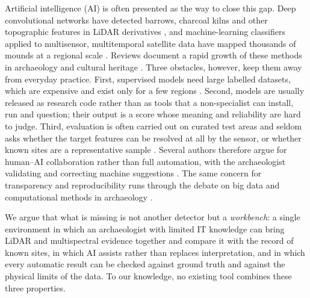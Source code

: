 Artificial intelligence (AI) is often presented as the way to close this gap. Deep convolutional networks have detected barrows, charcoal kilns and other topographic features in LiDAR derivatives \citep{verschoof2019rcnn,trier2019arran,somrak2020maya}, and machine-learning classifiers applied to multisensor, multitemporal satellite data have mapped thousands of mounds at a regional scale \citep{orengo2020mounds}. Reviews document a rapid growth of these methods in archaeology and cultural heritage \citep{davis2019obia,fiorucci2020mlch,bickler2021ml}. Three obstacles, however, keep them away from everyday practice. First, supervised models need large labelled datasets, which are expensive and exist only for a few regions \citep{kokalj2023mlready}. Second, models are usually released as research code rather than as tools that a non-specialist can install, run and question; their output is a score whose meaning and reliability are hard to judge. Third, evaluation is often carried out on curated test areas and seldom asks whether the target features can be resolved at all by the sensor, or whether known sites are a representative sample \citep{opitz2018trends,fontana2024sampling}. Several authors therefore argue for human--AI collaboration rather than full automation, with the archaeologist validating and correcting machine suggestions \citep{lambers2019citizen,doneus2022hitl,casini2023humanai}. The same concern for transparency and reproducibility runs through the debate on big data and computational methods in archaeology \citep{huggett2020bigdata,marwick2017reproducibility}.

We argue that what is missing is not another detector but a \emph{workbench}: a single environment in which an archaeologist with limited IT knowledge can bring LiDAR and multispectral evidence together and compare it with the record of known sites, in which AI assists rather than replaces interpretation, and in which every automatic result can be checked against ground truth and against the physical limits of the data. To our knowledge, no existing tool combines these three properties.

